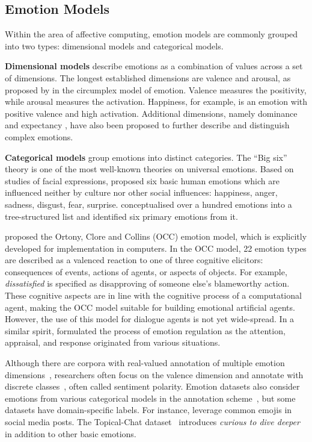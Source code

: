 \documentclass[10pt, a4paper]{article}
\begin{document}
\subsection{Emotion Models}
Within the area of affective computing, emotion models are commonly grouped into two types: dimensional models and categorical models.

\textbf{Dimensional models} describe emotions as a combination of values across a set of dimensions. The longest established dimensions are valence and arousal, as proposed by  in the circumplex model of emotion. Valence measures the positivity, while arousal measures the activation. Happiness, for example, is an emotion with positive valence and high activation. Additional dimensions, namely dominance and expectancy \cite{fontaine2007world}, have also been proposed to further describe and distinguish complex emotions.\par

\textbf{Categorical models} group emotions into distinct categories. The ``Big six'' theory is one of the most well-known theories on universal emotions. Based on studies of facial expressions,  proposed six basic human emotions which are influenced neither by culture nor other social influences: happiness, anger, sadness, disgust, fear, surprise.   conceptualised over a hundred emotions into a tree-structured list and identified six primary emotions from it.

 proposed the Ortony, Clore and Collins (OCC) emotion model, which is explicitly developed for implementation in computers. In the OCC model, 22 emotion types are described as a valenced reaction to one of three cognitive elicitors: consequences of events, actions of agents, or aspects of objects. For example, \textit{dissatisfied} is specified as disapproving of someone else's blameworthy action. These cognitive aspects are in line with the cognitive process of a computational agent, making the OCC model suitable for building emotional artificial agents. However, the use of this model for dialogue agents is not yet wide-spread. In a similar spirit,  formulated the process of emotion regulation as the attention, appraisal, and response originated from various situations. \par


Although there are corpora with real-valued annotation of multiple emotion dimensions~\cite{preotiuc-pietro-etal-2016-modelling,buechel-hahn-2017-emobank}, researchers often focus on the valence dimension and annotate with discrete classes~\cite{socher-etal-2013-recursive}, often called sentiment polarity. Emotion datasets also consider emotions from various categorical models in the annotation scheme~\cite{li-etal-2017-dailydialog,poria-etal-2019-meld}, but some datasets have domain-specific labels. For instance,  leverage common emojis in social media posts. The Topical-Chat dataset~\cite{Gopalakrishnan2019} introduces \textit{curious to dive deeper} in addition to other basic emotions.\par
\end{document}

